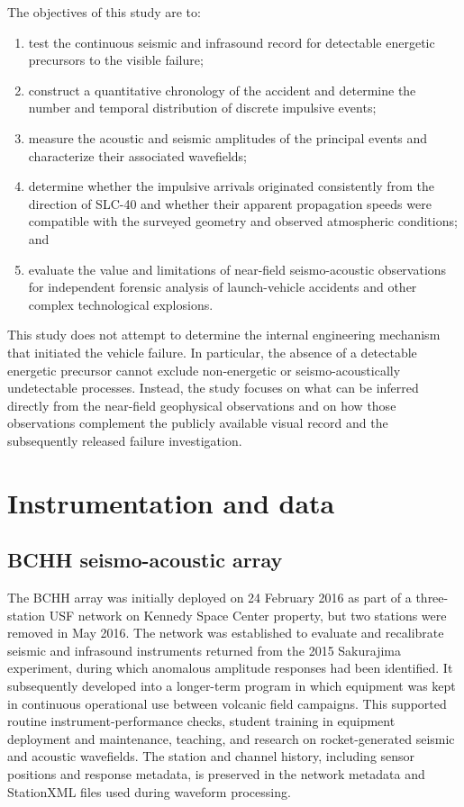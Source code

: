\documentclass[]{seismica}
\begin{document}
The objectives of this study are to:
\begin{enumerate}
  \item test the continuous seismic and infrasound record for detectable
        energetic precursors to the visible failure;
  \item construct a quantitative chronology of the accident and determine the
        number and temporal distribution of discrete impulsive events;
  \item measure the acoustic and seismic amplitudes of the principal events
        and characterize their associated wavefields;
  \item determine whether the impulsive arrivals originated consistently from
        the direction of SLC-40 and whether their apparent propagation speeds
        were compatible with the surveyed geometry and observed atmospheric
        conditions; and
  \item evaluate the value and limitations of near-field seismo-acoustic
        observations for independent forensic analysis of launch-vehicle
        accidents and other complex technological explosions.
\end{enumerate}

This study does not attempt to determine the internal engineering mechanism
that initiated the vehicle failure. In particular, the absence of a detectable
energetic precursor cannot exclude non-energetic or seismo-acoustically
undetectable processes. Instead, the study focuses on what can be inferred
directly from the near-field geophysical observations and on how those
observations complement the publicly available visual record and the
subsequently released failure investigation.


\section{Instrumentation and data}
\label{sec:data}

\subsection{BCHH seismo-acoustic array}

The BCHH array was initially deployed on 24 February 2016 as part of a
three-station USF network on Kennedy Space Center property, but two stations
were removed in May 2016. The network was established to evaluate and
recalibrate seismic and infrasound instruments returned from the 2015
Sakurajima experiment, during which anomalous amplitude responses had been
identified. It subsequently developed into a longer-term program in which
equipment was kept in continuous operational use between volcanic field
campaigns. This supported routine instrument-performance checks, student
training in equipment deployment and maintenance, teaching, and research on
rocket-generated seismic and acoustic wavefields. The station and channel history, 
including sensor positions and response metadata, is preserved in the network 
metadata and StationXML files used during waveform processing.
\end{document}

